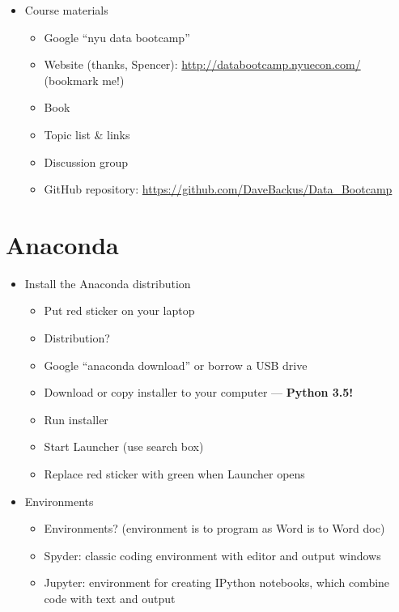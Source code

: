 \documentclass[11pt]{article}
\begin{document}
\begin{itemize}
\item Course materials
\begin{itemize}
\item Google ``nyu data bootcamp''
\item Website (thanks, Spencer):  \url{http://databootcamp.nyuecon.com/}  (bookmark me!) 
\item Book
\item Topic list \& links
\item Discussion group
\item GitHub repository:  \url{https://github.com/DaveBackus/Data_Bootcamp}  
\end{itemize}

\end{itemize}


\section*{Anaconda}

\begin{itemize}
\item Install the Anaconda distribution
\begin{itemize} 
\item Put red sticker on your laptop
\item Distribution?
\item Google ``anaconda download'' or borrow a USB drive
\item Download or copy installer to your computer --- {\bf Python 3.5!} 
\item Run installer 
\item Start Launcher (use search box)
\item Replace red sticker with green when Launcher opens   
\end{itemize}

\item Environments 
\begin{itemize}
\item Environments?  (environment is to program as Word is to Word doc) 
\item Spyder:  classic coding environment with editor and output windows 
\item Jupyter:  environment for creating IPython notebooks, which combine code with text and output 
\end{itemize}

\end{itemize}
\end{document}
